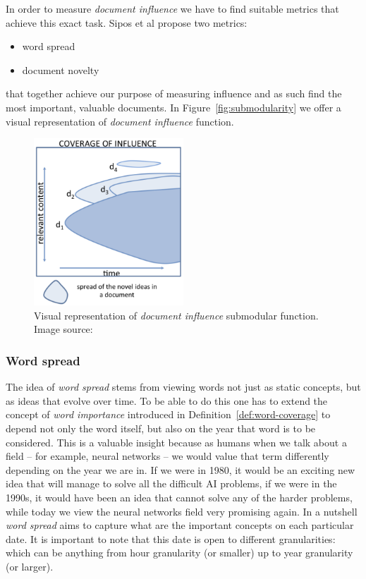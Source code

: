 In order to measure \emph{document influence} we have to find suitable metrics
that achieve this exact task. Sipos et al \cite{sipos2012temporal} propose two
metrics:
\begin{itemize}
  \item word spread
  \item document novelty
\end{itemize}
that together achieve our purpose of measuring influence and as such find the
most important, valuable documents.
In Figure~\ref{fig:submodularity} we offer a visual representation of
\emph{document influence} function.

\begin{figure}
  \centering
  \includegraphics[width=0.5\textwidth,natwidth=583,natheight=652]{images/doc-infl.png}
  \caption{Visual representation of \emph{document influence} submodular
  function. Image source: \cite{sipos2012temporal}}
  \label{fig:doc-infl}
\end{figure}

\subsubsection{Word spread}

The idea of \emph{word spread} stems from viewing words not just as static
concepts, but as ideas that evolve over time.
To be able to do this one has to extend the concept of \emph{word importance}
introduced in Definition~\vref{def:word-coverage} to depend not only the word
itself, but also on the year that word is to be considered.
This is a valuable insight because as humans when we talk about a field -- for
example, neural networks -- we would value that term differently depending on
the year we are in. If we were in 1980, it would be an exciting new idea that
will manage to solve all the difficult \acl{AI} problems, if we were in the
1990s, it would have been an idea that cannot solve any of the harder problems,
while today we view the neural networks field very promising again.
In a nutshell \emph{word spread} aims to capture what are the important
concepts on each particular date. It is important to note that this date is
open to different granularities: which can be anything from hour granularity
(or smaller) up to year granularity (or larger).

